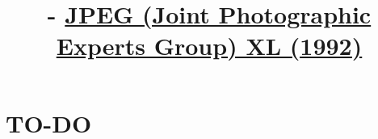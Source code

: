 

\title{\SM{} - \href{https://en.wikipedia.org/wiki/JPEG}{JPEG (Joint Photographic Experts Group) XL (1992)}}

\maketitle
\tableofcontents

\section{TO-DO}
